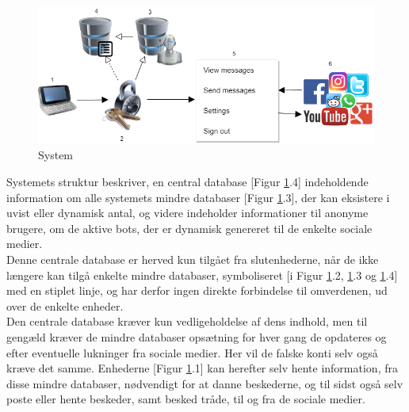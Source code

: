 \begin{figure}[H]
    \centering
    \includegraphics[width=0.70\linewidth]{Projectdoc/Assets/Illustrationer/System_struckure.png}
    \caption{System}
    \label{fig:sysdiagram}
\end{figure}

Systemets struktur beskriver, en central database [Figur \ref{fig:sysdiagram}.4] indeholdende information om alle systemets mindre databaser [Figur \ref{fig:sysdiagram}.3], der kan eksistere i uvist eller dynamisk antal, og videre indeholder informationer til anonyme brugere, om de aktive bots, der er dynamisk genereret til de enkelte sociale medier.\\
Denne centrale database er herved kun tilgået fra slutenhederne, når de ikke længere kan tilgå enkelte mindre databaser, symboliseret [i Figur \ref{fig:sysdiagram}.2, \ref{fig:sysdiagram}.3 og \ref{fig:sysdiagram}.4] med en stiplet linje, og har derfor ingen direkte forbindelse til omverdenen, ud over de enkelte enheder.\\
Den centrale database kræver kun vedligeholdelse af dens indhold, men til gengæld kræver de mindre databaser opsætning for hver gang de opdateres og efter eventuelle lukninger fra sociale medier. Her vil de falske konti selv også kræve det samme.
Enhederne [Figur \ref{fig:sysdiagram}.1] kan herefter selv hente information, fra disse mindre databaser, nødvendigt for at danne beskederne, og til sidst også selv poste eller hente beskeder, samt besked tråde, til og fra de sociale medier.

